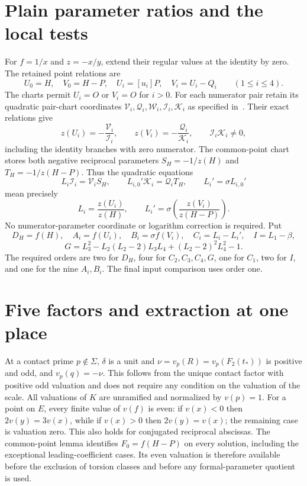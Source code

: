 \documentclass[11pt,a4paper]{article}
\begin{document}
\section{Plain parameter ratios and the local tests}
For $f=1/x$ and $z=-x/y$, extend their regular values at the
identity by zero. The retained point relations are
\[
 U_0=H,\quad V_0=H-P,\quad U_i=[u_i]P,\quad V_i=U_i-Q_i
 \qquad(1\le i\le4).
\]
The charts permit $U_i=O$ or $V_i=O$ for $i>0$.
For each numerator pair retain its quadratic pair-chart coordinates
$\mathcal V_i,\mathcal Q_i,\mathcal W_i,\mathcal I_i,\mathcal K_i$
as specified in~\cite{Even}. Their exact relations give
\[
 z(U_i)=-\frac{\mathcal V_i}{\mathcal I_i},\qquad
 z(V_i)=-\frac{\mathcal Q_i}{\mathcal K_i},\qquad
 \mathcal I_i\mathcal K_i\ne0,
\]
including the identity branches with zero numerator.
The common-point chart stores both negative reciprocal parameters
$S_H=-1/z(H)$ and $T_H=-1/z(H-P)$. Thus the quadratic equations
\[
 L_i\mathcal I_i=\mathcal V_iS_H,\qquad
 L_{i,0}'\mathcal K_i=\mathcal Q_iT_H,\qquad
 L_i'=\sigma L_{i,0}'
\]
mean precisely
\[
 L_i=\frac{z(U_i)}{z(H)},\qquad
 L_i'=\sigma\!\left(\frac{z(V_i)}{z(H-P)}\right).
\]
No numerator-parameter coordinate or logarithm correction is required.
Put
\[
 D_H=f(H),\quad A_i=f(U_i),\quad B_i=\sigma f(V_i),\quad
 C_i=L_i-L_i',\quad I=L_1-\beta,
\]
\[
 G=L_3^2-L_2(L_2-2)L_3L_4+(L_2-2)^2L_4^2-1.
\]
The required orders are two for $D_H$, four for $C_2,C_3,C_4,G$,
one for $C_1$, two for $I$, and one for the nine $A_i,B_i$.
The final input comparison uses order one.

\section{Five factors and extraction at one place}
At a contact prime $p\notin\Sigma$, $\delta$ is a unit and
$\nu=v_p(R)=v_p(F_2(t_*))$ is positive and odd, and $v_p(q)=-\nu$. This follows
from the unique contact factor with positive odd valuation and
does not require any condition on the valuation of the scale. All valuations
of $K$ are unramified and normalized by $v(p)=1$.
For a point on $E$, every finite value of $v(f)$ is even: if
$v(x)<0$ then $2v(y)=3v(x)$, while if $v(x)>0$ then
$2v(y)=v(x)$; the remaining case is valuation zero.
This also holds for conjugated reciprocal abscissas. The common-point lemma identifies $F_0=f(H-P)$ on every solution,
including the exceptional leading-coefficient cases. Its even valuation
is therefore available before the exclusion of torsion classes and
before any formal-parameter quotient is used.
\end{document}
